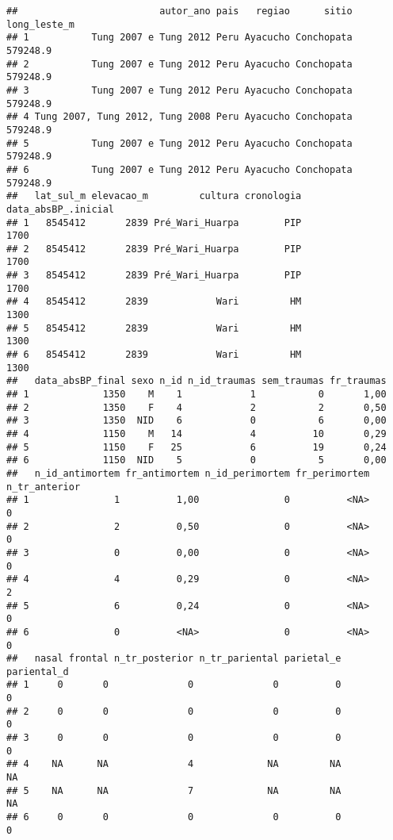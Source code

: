 \documentclass[
]{article}
\begin{document}
\begin{verbatim}
##                         autor_ano pais   regiao      sitio long_leste_m
## 1           Tung 2007 e Tung 2012 Peru Ayacucho Conchopata     579248.9
## 2           Tung 2007 e Tung 2012 Peru Ayacucho Conchopata     579248.9
## 3           Tung 2007 e Tung 2012 Peru Ayacucho Conchopata     579248.9
## 4 Tung 2007, Tung 2012, Tung 2008 Peru Ayacucho Conchopata     579248.9
## 5           Tung 2007 e Tung 2012 Peru Ayacucho Conchopata     579248.9
## 6           Tung 2007 e Tung 2012 Peru Ayacucho Conchopata     579248.9
##   lat_sul_m elevacao_m         cultura cronologia data_absBP_.inicial
## 1   8545412       2839 Pré_Wari_Huarpa        PIP                1700
## 2   8545412       2839 Pré_Wari_Huarpa        PIP                1700
## 3   8545412       2839 Pré_Wari_Huarpa        PIP                1700
## 4   8545412       2839            Wari         HM                1300
## 5   8545412       2839            Wari         HM                1300
## 6   8545412       2839            Wari         HM                1300
##   data_absBP_final sexo n_id n_id_traumas sem_traumas fr_traumas
## 1             1350    M    1            1           0       1,00
## 2             1350    F    4            2           2       0,50
## 3             1350  NID    6            0           6       0,00
## 4             1150    M   14            4          10       0,29
## 5             1150    F   25            6          19       0,24
## 6             1150  NID    5            0           5       0,00
##   n_id_antimortem fr_antimortem n_id_perimortem fr_perimortem n_tr_anterior
## 1               1          1,00               0          <NA>             0
## 2               2          0,50               0          <NA>             0
## 3               0          0,00               0          <NA>             0
## 4               4          0,29               0          <NA>             2
## 5               6          0,24               0          <NA>             0
## 6               0          <NA>               0          <NA>             0
##   nasal frontal n_tr_posterior n_tr_pariental parietal_e pariental_d
## 1     0       0              0              0          0           0
## 2     0       0              0              0          0           0
## 3     0       0              0              0          0           0
## 4    NA      NA              4             NA         NA          NA
## 5    NA      NA              7             NA         NA          NA
## 6     0       0              0              0          0           0

\end{verbatim}
\end{document}
